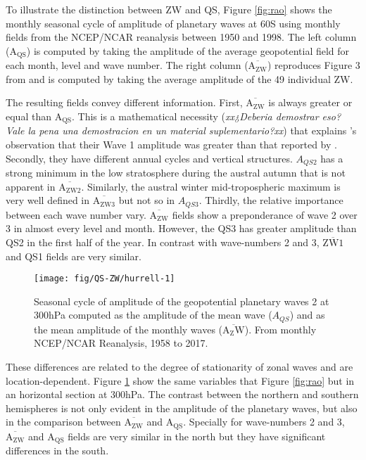 \documentclass[draft,linenumbers]{agujournal2018}
\begin{document}
To illustrate the distinction between ZW and QS, Figure \ref{fig:rao}
shows the monthly seasonal cycle of amplitude of planetary waves at
60\degree S using monthly fields from the NCEP/NCAR reanalysis
\citep{Kalnay1996} between 1950 and 1998. The left column
(\(\mathrm{A_{QS}}\)) is computed by taking the amplitude of the average
geopotential field for each month, level and wave number. The right
column (\(\overline{\mathrm{A_{ZW}}}\)) reproduces Figure 3 from
\citet{Rao2004} and is computed by taking the average amplitude of the
49 individual ZW.

The resulting fields convey different information. First,
\(\overline{\mathrm{A_{ZW}}}\) is always greater or equal than
\(\mathrm{A_{QS}}\). This is a mathematical necessity (\emph{xx¿Deberia
demostrar eso? Vale la pena una demostracion en un material
suplementario?xx}) that explains \citet{Rao2004}'s observation that
their Wave 1 amplitude was greater than that reported by
\citet{Hurrell1998}. Secondly, they have different annual cycles and
vertical structures. \(A_{QS2}\) has a strong minimum in the low
stratosphere during the austral autumn that is not apparent in
\(\overline{\mathrm{A_{ZW2}}}\). Similarly, the austral winter
mid-tropospheric maximum is very well defined in
\(\overline{\mathrm{A_{ZW3}}}\) but not so in \(A_{QS3}\). Thirdly, the
relative importance between each wave number vary.
\(\overline{\mathrm{A_{ZW}}}\) fields show a preponderance of wave 2
over 3 in almost every level and month. However, the QS3 has greater
amplitude than QS2 in the first half of the year. In contrast with
wave-numbers 2 and 3, \(\overline{\mathrm{ZW1}}\) and QS1 fields are
very similar.

\begin{figure}[h]

{\centering \texttt{[image: fig/QS-ZW/hurrell-1]} 

}

\caption{Seasonal cycle of amplitude of the geopotential planetary waves 2 at 300hPa computed as the amplitude of the mean wave ($A_{QS}$) and as the mean amplitude of the monthly waves ($\overline{\mathrm{A_ZW}}$). From monthly NCEP/NCAR Reanalysis, 1958 to 2017.}\label{fig:hurrell}
\end{figure}

These differences are related to the degree of stationarity of zonal
waves and are location-dependent. Figure \ref{fig:hurrell} show the same
variables that Figure \ref{fig:rao} but in an horizontal section at
300hPa. The contrast between the northern and southern hemispheres is
not only evident in the amplitude of the planetary waves, but also in
the comparison between \(\overline{\mathrm{A_{ZW}}}\) and
\(\mathrm{A_{QS}}\). Specially for wave-numbers 2 and 3,
\(\overline{\mathrm{A_{ZW}}}\) and \(\mathrm{A_{QS}}\) fields are very
similar in the north but they have significant differences in the south.
\end{document}
